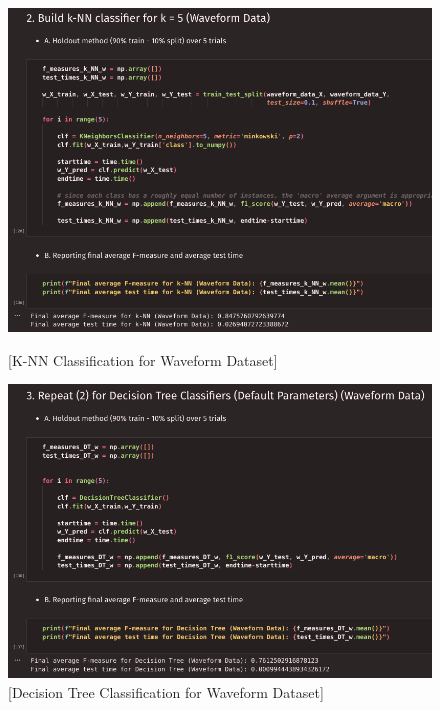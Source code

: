 \documentclass{article}
\begin{document}
    \begin{figure}[H]
        \centering
        \begin{minipage}[t]{0.48\textwidth}
            \centering
            \includegraphics[width=\textwidth, height=0.25\textheight]{./I_2_w_a.png}
            \caption{[K-NN Classification for Waveform Dataset]}
        \end{minipage}
        \hfill
        \begin{minipage}[t]{0.48\textwidth}
            \centering
            \includegraphics[width=\textwidth, height=0.25\textheight]{./I_2_w_b.png}
            \caption{[Decision Tree Classification for Waveform Dataset]}
        \end{minipage}
    \end{figure}
\end{document}

